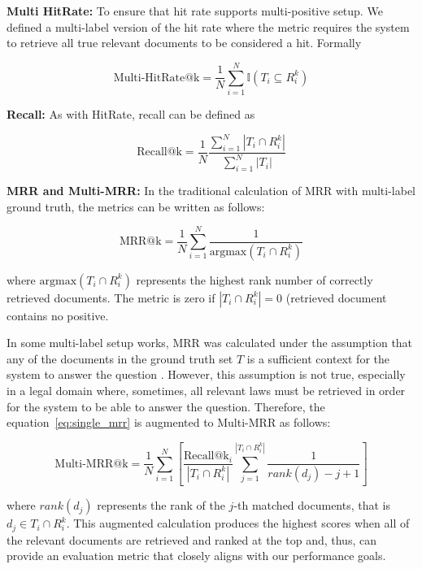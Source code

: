 \textbf{Multi HitRate: } To ensure that hit rate supports multi-positive setup. 
%
We defined a multi-label version of the hit rate where the metric requires the system to retrieve all true relevant documents to be considered a hit. 
%
Formally

\begin{equation}
    \text{Multi-HitRate@k}=\frac{1}{N}\sum_{i=1}^{N}\mathbb{I}(T_i\subseteq R_i^k)
\end{equation}

\textbf{Recall: }As with HitRate, recall can be defined as

\begin{equation}
    \text{Recall@k}=\frac{1}{N}\frac{\sum_{i=1}^N |T_i\cap R_i^k|}{\sum_{i=1}^N |T_i|}
\end{equation}

\textbf{MRR and Multi-MRR: }In the traditional calculation of MRR with multi-label ground truth, the metrics can be written as follows:

\begin{equation}
    \text{MRR@k} = \frac{1}{N}\sum_{i=1}^N \frac{1}{\text{argmax}(T_i \cap R_i^k)} \label{eq:single_mrr}
\end{equation}

where $\text{argmax}(T_i\cap R_i^k)$ represents the highest rank number of correctly retrieved documents. 
%
The metric is zero if $|T_i \cap R_i^k| = 0$ (retrieved document contains no positive.

In some multi-label setup works, MRR was calculated under the assumption that any of the documents in the ground truth set $T$ is a sufficient context for the system to answer the question \cite{DBLP:journals/corr/abs-2006-15498, 10.1145/3397271.3401075}. 
%
However, this assumption is not true, especially in a legal domain where, sometimes, all relevant laws must be retrieved in order for the system to be able to answer the question. Therefore, the equation~\ref{eq:single_mrr} is augmented to Multi-MRR as follows:

\begin{equation}
    \text{Multi-MRR@k}=\frac{1}{N}\sum_{i=1}^N
    \left[
        \frac{\text{Recall@k}_{i}}{|T_i \cap R_i^k|}\sum_{j=1}^{|T_i\cap R_i^k|}
            \frac{1}{rank(d_j) - j + 1}
    \right]
\end{equation}

where $rank(d_j)$ represents the rank of the $j$-th matched documents, that is $d_j \in T_i \cap R^k_i$. 
%
This augmented calculation produces the highest scores when all of the relevant documents are retrieved and ranked at the top and, thus, can provide an evaluation metric that closely aligns with our performance goals.


